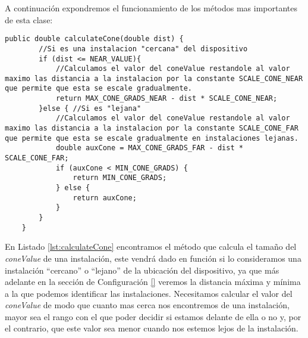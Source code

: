 

A continuación expondremos el funcionamiento de los métodos mas importantes de esta clase:

\begin{lstlisting}[caption={Código para calcular el \textit{coneValue} de identificación de cada instalación.}, label={lst:calculateCone}]
    public double calculateCone(double dist) {
        //Si es una instalacion "cercana" del dispositivo
        if (dist <= NEAR_VALUE){
            //Calculamos el valor del coneValue restandole al valor maximo las distancia a la instalacion por la constante SCALE_CONE_NEAR que permite que esta se escale gradualmente.
            return MAX_CONE_GRADS_NEAR - dist * SCALE_CONE_NEAR;
        }else { //Si es "lejana"
            //Calculamos el valor del coneValue restandole al valor maximo las distancia a la instalacion por la constante SCALE_CONE_FAR que permite que esta se escale gradualmente en instalaciones lejanas.
            double auxCone = MAX_CONE_GRADS_FAR - dist * SCALE_CONE_FAR;
            if (auxCone < MIN_CONE_GRADS) {
                return MIN_CONE_GRADS;
            } else {
                return auxCone;
            }
        }
    }
\end{lstlisting}
 
En Listado \ref{lst:calculateCone} encontramos el método que calcula el tamaño del \textit{coneValue} de una instalación, este vendrá dado en función si lo consideramos una instalación ``cercano'' o ``lejano'' de la ubicación del dispositivo, ya que más adelante en la sección de Configuración \ref{} veremos la distancia máxima y mínima a la que podemos identificar las instalaciones. 
Necesitamos calcular el valor del \textit{coneValue} de modo que cuanto mas cerca nos encontremos de una instalación, mayor sea el rango con el que poder decidir si estamos delante de ella o no y, por el contrario, que este valor sea menor cuando nos estemos lejos de la instalación. 

